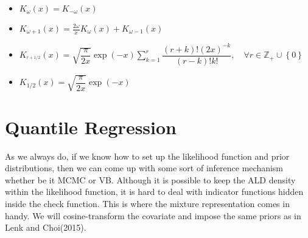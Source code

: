 \documentclass[12pt]{article}
\begin{document}
\begin{itemize}
  \item $K_{\omega}\left(x\right) = K_{-\omega}\left(x\right)$
  \item $K_{\omega+1}\left(x\right) = \frac{2\omega}{x}K_{\omega}\left(x\right) + K_{\omega-1}\left(x\right)$
  \item $K_{^{r+1/2}}\left(x\right)=\sqrt{\dfrac{\pi}{2x}}\exp\left(-x\right)\displaystyle \sum_{k=1}^{r}\dfrac{\left(r+k\right)!\left(2x\right)^{-k}}{\left(r-k\right)!k!}, \quad \forall r \in \mathbb{Z}_{+}\cup\left\{0\right\}$
  \item $K_{1/2}\left(x\right) = \sqrt{\dfrac{\pi}{2x}}\exp\left(-x\right)$
\end{itemize}
\section{Quantile Regression}
  As we always do, if we know how to set up the likelihood function and prior distributions, then we can come up with some sort of inference mechanism whether be it MCMC or VB. Although it is possible to keep the ALD density within the likelihood function, it is hard to deal with indicator functions hidden inside the check function. This is where the mixture representation comes in handy. We will cosine-transform the covariate and impose the same priors as in Lenk and Choi(2015).
\end{document}
